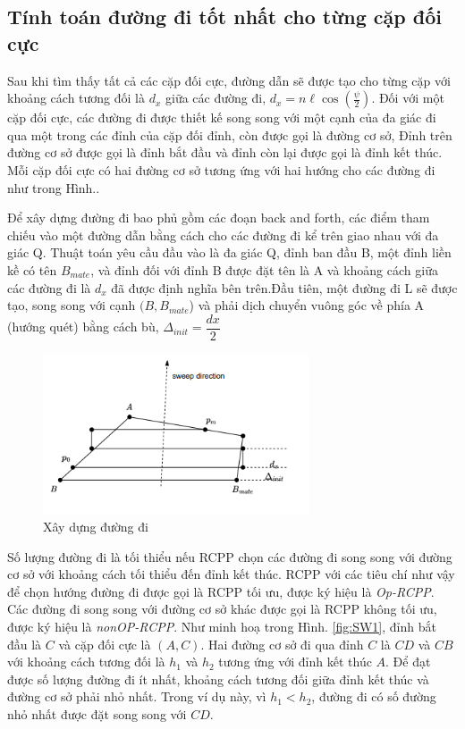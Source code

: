 \subsection{Tính toán đường đi tốt nhất cho từng cặp đối cực}
Sau khi tìm thấy tất cả các cặp đối cực, đường dẫn sẽ được tạo cho từng cặp với khoảng cách tương đối là $d_x$ giữa các đường đi, $d_x = n \ell\cos{(\frac{\psi}{2})}$. 
Đối với một cặp đối cực, các đường đi được thiết kế song song với một cạnh của đa giác đi qua một trong các đỉnh của cặp đối đỉnh, còn được gọi là đường cơ sở, Đỉnh trên đường cơ sở được gọi là đỉnh bắt đầu và đỉnh còn lại được gọi là đỉnh kết thúc. Mỗi cặp đối cực có hai đường cơ sở tương ứng với hai hướng cho các đường đi như trong Hình..

Để xây dựng đường đi bao phủ gồm các đoạn back and forth, các điểm tham chiếu vào một đường dẫn  bằng cách cho các đường đi kể trên giao nhau với đa giác Q. Thuật toán yêu cầu đầu vào là đa giác Q, đỉnh ban đầu B, một đỉnh liền kề có tên $B_{mate}$, và đỉnh đối với đỉnh B được đặt tên là A và khoảng cách giữa các đường đi là $d_x$ đã được định nghĩa bên trên.Đầu tiên, một đường đi L sẽ được tạo, song song với cạnh $( B,B_{mate}$) và phải dịch chuyển vuông góc về phía A (hướng quét) bằng cách bù, $\Delta_{init} = \dfrac{dx}{2}$

    \begin{figure}[H]
        \centering
        \includegraphics[width=0.7\textwidth]{chapter4/image/anh5.png}
        \caption{Xây dựng đường đi }
        \label{fig:anh5}
    \end{figure}

Số lượng đường đi là tối thiểu nếu RCPP chọn các đường đi song song với đường cơ sở với khoảng cách tối thiểu đến đỉnh kết thúc. RCPP với các tiêu chí như vậy để chọn hướng đường đi được gọi là RCPP tối ưu, được ký hiệu là \emph{Op-RCPP}. Các đường đi song song với đường cơ sở khác được gọi là RCPP không tối ưu, được ký hiệu là \emph{nonOP-RCPP}. Như minh hoạ trong Hình. \ref{fig:SW1}, đỉnh bắt đầu là $C$ và cặp đối cực là $(A,C)$. Hai đường cơ sở đi qua đỉnh $C$ là $CD$ và $CB$ với khoảng cách tương đối là $h_1$ và $h_2$ tương ứng với đỉnh kết thúc $A$. Để đạt được số lượng đường đi ít nhất, khoảng cách tương đối giữa đỉnh kết thúc và đường cơ sở phải nhỏ nhất. Trong ví dụ này, vì $h_1<h_2$, đường đi có số đường nhỏ nhất được đặt song song với $CD$.


